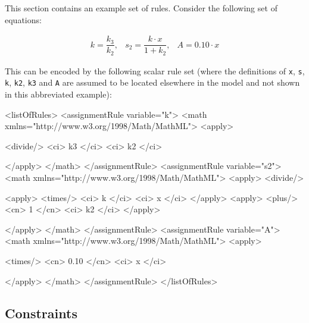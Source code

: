This section contains an example set of rules.  Consider the
following set of equations:
\begin{linenomath}
  \begin{equation*}
    \begin{array}{lll}
      k = \dfrac{k_3}{k_2}, & s_2 = \dfrac{k \cdot x}{1 + k_2}, & A = 0.10 \cdot x
    \end{array}
  \end{equation*}
\end{linenomath}
This can be encoded by the following scalar rule set (where the
definitions of \texttt{x}, \texttt{s}, \texttt{k}, \texttt{k2},
\texttt{k3} and \texttt{A} are assumed to be located elsewhere in
the model and not shown in this abbreviated example):

\begin{example}
<listOfRules>
    <assignmentRule variable="k">
        <math xmlns="http://www.w3.org/1998/Math/MathML">
            <apply>\begin{blockRelChange}
                <divide/>
                <ci> k3 </ci>
                <ci> k2 </ci>\end{blockRelChange}
            </apply>
        </math>
    </assignmentRule>
    <assignmentRule variable="s2">
        <math xmlns="http://www.w3.org/1998/Math/MathML">
            <apply>
                <divide/>\begin{blockRelChange}
                    <apply> 
                        <times/>
                        <ci> k </ci>
                        <ci> x </ci>
                    </apply>
                    <apply> 
                        <plus/>
                        <cn> 1 </cn>
                        <ci> k2 </ci>
                    </apply>\end{blockRelChange}
            </apply>
        </math>
    </assignmentRule>
    <assignmentRule variable="A">
        <math xmlns="http://www.w3.org/1998/Math/MathML">
            <apply>\begin{blockRelChange}
                <times/>
                <cn> 0.10 </cn>
                <ci> x </ci>\end{blockRelChange}
            </apply>
        </math>
    </assignmentRule>
</listOfRules>
\end{example}


\subsection{Constraints}
\label{sec:constraints}

